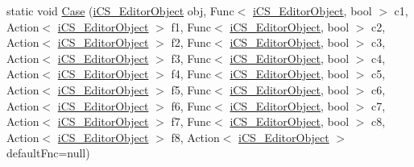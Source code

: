 \begin{DoxyCompactItemize}
\item 
static void \hyperlink{classi_c_s___i_storage_aa6d920a1a022ce46bded0e5d2e1f2e2d}{Case} (\hyperlink{classi_c_s___editor_object}{i\+C\+S\+\_\+\+Editor\+Object} obj, Func$<$ \hyperlink{classi_c_s___editor_object}{i\+C\+S\+\_\+\+Editor\+Object}, bool $>$ c1, Action$<$ \hyperlink{classi_c_s___editor_object}{i\+C\+S\+\_\+\+Editor\+Object} $>$ f1, Func$<$ \hyperlink{classi_c_s___editor_object}{i\+C\+S\+\_\+\+Editor\+Object}, bool $>$ c2, Action$<$ \hyperlink{classi_c_s___editor_object}{i\+C\+S\+\_\+\+Editor\+Object} $>$ f2, Func$<$ \hyperlink{classi_c_s___editor_object}{i\+C\+S\+\_\+\+Editor\+Object}, bool $>$ c3, Action$<$ \hyperlink{classi_c_s___editor_object}{i\+C\+S\+\_\+\+Editor\+Object} $>$ f3, Func$<$ \hyperlink{classi_c_s___editor_object}{i\+C\+S\+\_\+\+Editor\+Object}, bool $>$ c4, Action$<$ \hyperlink{classi_c_s___editor_object}{i\+C\+S\+\_\+\+Editor\+Object} $>$ f4, Func$<$ \hyperlink{classi_c_s___editor_object}{i\+C\+S\+\_\+\+Editor\+Object}, bool $>$ c5, Action$<$ \hyperlink{classi_c_s___editor_object}{i\+C\+S\+\_\+\+Editor\+Object} $>$ f5, Func$<$ \hyperlink{classi_c_s___editor_object}{i\+C\+S\+\_\+\+Editor\+Object}, bool $>$ c6, Action$<$ \hyperlink{classi_c_s___editor_object}{i\+C\+S\+\_\+\+Editor\+Object} $>$ f6, Func$<$ \hyperlink{classi_c_s___editor_object}{i\+C\+S\+\_\+\+Editor\+Object}, bool $>$ c7, Action$<$ \hyperlink{classi_c_s___editor_object}{i\+C\+S\+\_\+\+Editor\+Object} $>$ f7, Func$<$ \hyperlink{classi_c_s___editor_object}{i\+C\+S\+\_\+\+Editor\+Object}, bool $>$ c8, Action$<$ \hyperlink{classi_c_s___editor_object}{i\+C\+S\+\_\+\+Editor\+Object} $>$ f8, Action$<$ \hyperlink{classi_c_s___editor_object}{i\+C\+S\+\_\+\+Editor\+Object} $>$ default\+Fnc=null)
\item 

\end{DoxyCompactItemize}

